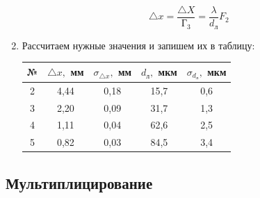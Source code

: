 \documentclass[a4paper, 12pt]{article}%
\begin{document}
\begin{enumerate}
\begin{equation}
\bigtriangleup x = \frac{\bigtriangleup X}{\text{Г}_3} = \frac{\lambda}{d_{\text{л}}} F_2
\end{equation}

\item Рассчитаем нужные значения и запишем их в таблицу:

\begin{center}
\begin{tabular}{|c|c|c|c|c|}
\hline 
№ & $\bigtriangleup x,$ мм & $\sigma_{\bigtriangleup x},$ мм & $d_{\text{л}},$ мкм & $\sigma_{d_{\text{л}}},$ мкм \\ 
\hline 
2 & 4,44 & 0,18 & 15,7 & 0,6 \\ 
\hline 
3 & 2,20 & 0,09 & 31,7 & 1,3 \\ 
\hline 
4 & 1,11 & 0,04 & 62,6 & 2,5 \\ 
\hline 
5 & 0,82 & 0,03 & 84,5 & 3,4 \\ 
\hline 
\end{tabular} 
\end{center}

\end{enumerate}

\subsection*{Мультиплицирование}
\end{document}
